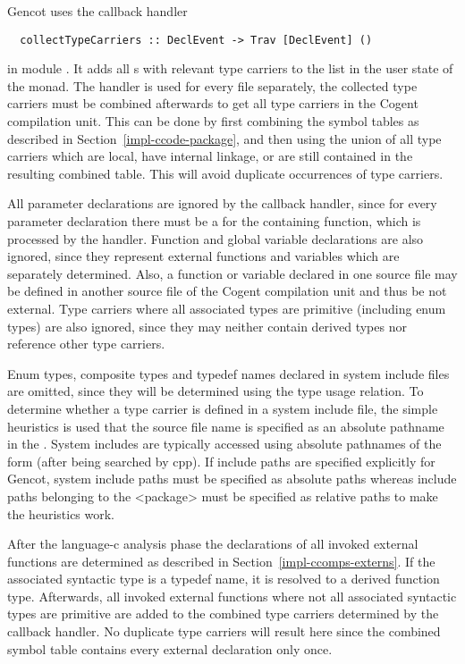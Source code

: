 Gencot uses the callback handler
\begin{verbatim}
  collectTypeCarriers :: DeclEvent -> Trav [DeclEvent] ()
\end{verbatim}
in module . It adds all s with relevant type carriers to the list in the 
user state of the  monad. The handler is used for every  file separately, the collected
type carriers must be combined afterwards to get all type carriers in the Cogent compilation unit. This can be
done by first combining the symbol tables as described in Section~\ref{impl-ccode-package}, and then using the union of all 
type carriers which are local, have internal linkage, or are still contained in the resulting combined table. 
This will avoid duplicate occurrences of type carriers.

All parameter declarations are ignored by the callback handler, since for every parameter declaration there must be 
a  for the containing function, which is processed by the handler. Function and global variable declarations 
are also ignored, since they represent external functions and variables which are separately determined. Also,
a function or variable declared in one source file may be defined in another source file of the Cogent compilation unit and thus 
be not external. Type carriers where all associated types are primitive (including enum types) are also ignored, 
since they may neither contain derived types nor reference other type carriers.

Enum types, composite types and typedef names declared in system include files are omitted, since they will be determined 
using the type usage relation. To determine whether
a type carrier is defined in a system include file, the simple heuristics is used that the source file name is specified
as an absolute pathname in the . System includes are typically accessed using absolute pathnames of the 
form  (after being searched by cpp). If include paths are specified explicitly for Gencot, 
system include paths must be 
specified as absolute paths whereas include paths belonging to the <package> must be specified as relative paths
to make the heuristics work.

After the language-c analysis phase the declarations of all invoked external functions are determined 
as described in Section~\ref{impl-ccomps-externs}. If the associated syntactic type is a typedef name, it is resolved
to a derived function type. Afterwards, all invoked external functions where not all associated syntactic types
are primitive are added to the combined type carriers determined by the callback handler. No duplicate type carriers
will result here since the combined symbol table contains every external declaration only once.

